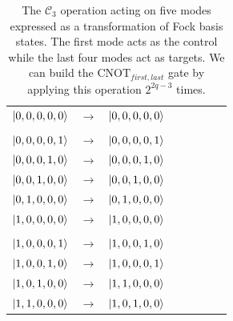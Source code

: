 \documentclass[aps,pra,twocolumn,showpacs,superscriptaddress,floatfix,10pt]{revtex4}
\begin{document}
\begin {table}[h]
\begin{center}
	\begin{tabular}{l*{6}{c}r} 
		$\ket{0,0,0,0,0}$  &  $\rightarrow$ & $\ket{0,0,0,0,0}$ \\ \\
		$\ket{0,0,0,0,1}$  & $\rightarrow$ & $\ket{0,0,0,0,1}$ \\
		$\ket{0,0,0,1,0}$ & $\rightarrow$ & $\ket{0,0,0,1,0}$ \\
		$\ket{0,0,1,0,0}$ & $\rightarrow$ & $\ket{0,0,1,0,0} $ \\ 
		$\ket{0,1,0,0,0}$ & $\rightarrow$ & $\ket{0,1,0,0,0} $\\
		$\ket{1,0,0,0,0}$ & $\rightarrow$ & $\ket{1,0,0,0,0} $ \\ \\
		$\ket{1,0,0,0,1}$  & $\rightarrow$ & $\ket{1,0,0,1,0}$ \\
		$\ket{1,0,0,1,0}$  & $\rightarrow$ & $\ket{1,0,0,0,1}$ \\
		$\ket{1,0,1,0,0}$  & $\rightarrow$ & $\ket{1,1,0,0,0}$ \\
		$\ket{1,1,0,0,0}$  & $\rightarrow$ & $\ket{1,0,1,0,0}$ \\
	\end{tabular}
	\caption{ \label{One Control Four Targets} The $\mathcal{C}_3$ operation acting on five modes expressed as a transformation of Fock basis states. The first mode acts as the control while the last four modes act as targets. We can build the $\mbox{CNOT}_{first,last}$ gate by applying this operation $2^{2 q - 3}$ times.}
\end{center}
\end{table}
\end{document}
